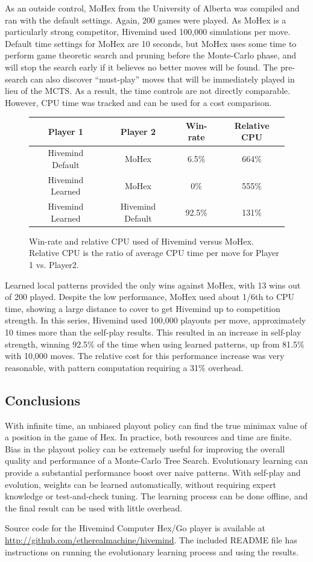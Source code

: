 \documentclass[11pt]{report}
\begin{document}
As an outside control, MoHex from the University of Alberta was compiled and ran with the default settings\cite{mohex}. Again, 200 games were played. As MoHex is a particularly strong competitor, Hivemind used 100,000 simulations per move. Default time settings for MoHex are 10 seconds, but MoHex uses some time to perform game theoretic search and pruning before the Monte-Carlo phase, and will stop the search early if it believes no better moves will be found. The pre-search can also discover ``must-play'' moves that will be immediately played in lieu of the MCTS. As a result, the time controls are not directly comparable. However, CPU time was tracked and can be used for a cost comparison.

\begin{figure}
	\begin{center}
		\begin{tabular}{c c c c}
		Player 1 & Player 2 & Win-rate & Relative CPU \\
		\hline
		Hivemind Default & MoHex & 6.5\% & 664\% \\
		Hivemind Learned & MoHex & 0\% & 555\% \\
		Hivemind Learned & Hivemind Default & 92.5\% & 131\% \\
		\end{tabular}
	\end{center}
	\caption{Win-rate and relative CPU used of Hivemind versus MoHex. Relative CPU is the ratio of average CPU time per move for Player 1 vs. Player2.}
	\label{fig:relativecpu}
\end{figure}

Learned local patterns provided the only wins against MoHex, with 13 wins out of 200 played. Despite the low performance, MoHex used about 1/6th to CPU time, showing a large distance to cover to get Hivemind up to competition strength. In this series, Hivemind used 100,000 playouts per move, approximately 10 times more than the self-play results. This resulted in an increase in self-play strength, winning 92.5\% of the time when using learned patterns, up from 81.5\% with 10,000 moves. The relative cost for this performance increase was very reasonable, with pattern computation requiring a 31\% overhead.

\subsection{Conclusions}
With infinite time, an unbiased playout policy can find the true minimax value of a position in the game of Hex. In practice, both resources and time are finite. Bias in the playout policy can be extremely useful for improving the overall quality and performance of a Monte-Carlo Tree Search. Evolutionary learning can provide a substantial performance boost over naive patterns. With self-play and evolution, weights can be learned automatically, without requiring expert knowledge or test-and-check tuning. The learning process can be done offline, and the final result can be used with little overhead.

Source code for the Hivemind Computer Hex/Go player is available at \url{http://github.com/etherealmachine/hivemind}. The included README file has instructions on running the evolutionary learning process and using the results.



\end{document}
